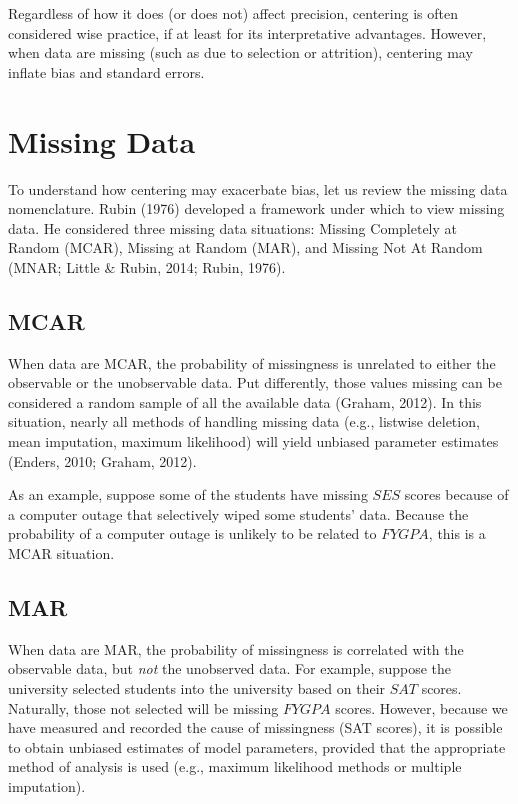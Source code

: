 \documentclass[english,man]{apa6}
\theoremstyle{definition}
\theoremstyle{definition}
\theoremstyle{remark}
\begin{document}
Regardless of how it does (or does not) affect precision, centering is
often considered wise practice, if at least for its interpretative
advantages. However, when data are missing (such as due to selection or
attrition), centering may inflate bias and standard errors.

\section{Missing Data}\label{missing-data}

To understand how centering may exacerbate bias, let us review the
missing data nomenclature. Rubin (1976) developed a framework under
which to view missing data. He considered three missing data situations:
Missing Completely at Random (MCAR), Missing at Random (MAR), and
Missing Not At Random (MNAR; Little \& Rubin, 2014; Rubin, 1976).

\subsection{MCAR}\label{mcar}

When data are MCAR, the probability of missingness is unrelated to
either the observable or the unobservable data. Put differently, those
values missing can be considered a random sample of all the available
data (Graham, 2012). In this situation, nearly all methods of handling
missing data (e.g., listwise deletion, mean imputation, maximum
likelihood) will yield unbiased parameter estimates (Enders, 2010;
Graham, 2012).

As an example, suppose some of the students have missing \(SES\) scores
because of a computer outage that selectively wiped some students' data.
Because the probability of a computer outage is unlikely to be related
to \(FYGPA\), this is a MCAR situation.

\subsection{MAR}\label{mar}

When data are MAR, the probability of missingness is correlated with the
observable data, but \emph{not} the unobserved data. For example,
suppose the university selected students into the university based on
their \(SAT\) scores. Naturally, those not selected will be missing
\(FYGPA\) scores. However, because we have measured and recorded the
cause of missingness (SAT scores), it is possible to obtain unbiased
estimates of model parameters, provided that the appropriate method of
analysis is used (e.g., maximum likelihood methods or multiple
imputation).
\end{document}
